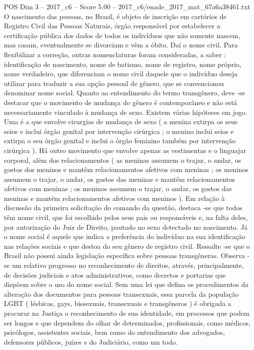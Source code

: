 \begin{textsample}{POS Dim 3 – 2017\_c6 – Score 5.00 – 2017\_c6/enade\_2017\_mat\_67a6a38461.txt}
O nascimento das pessoas, no Brasil, é objeto de inscrição em cartórios de Registro Civil das Pessoas Naturais, órgão responsável por estabelecer a certificação pública dos dados de todos os indivíduos que não somente nascem, mas casam, eventualmente se divorciam e vêm a óbito.
Daí o nome civil.
Para flexibilizar a correção, outras nomenclaturas foram consideradas, a saber : identificação de nascimento, nome de batismo, nome de registro, nome próprio, nome verdadeiro, que diferenciam o nome civil daquele que o indivíduo deseja utilizar para traduzir a sua opção pessoal de gênero, que se convencionou denominar nome social.
Quanto ao entendimento do termo transgênero, deve -se destacar que o movimento de mudança do gênero é contemporâneo e não está necessariamente vinculado à mudança de sexo.
Existem várias hipóteses em jogo.
Uma é a que envolve cirurgias de mudança de sexo ( a menina extirpa os seus seios e inclui órgão genital por intervenção cirúrgica ; o menino inclui seios e extirpa o seu órgão genital e inclui o órgão feminino também por intervenção cirúrgica ).
Há outro movimento que envolve apenas as vestimentas e o linguajar corporal, além dos relacionamentos ( as meninas assumem o trajar, o andar, os gostos dos meninos e mantêm relacionamentos afetivos com meninas ; os meninos assumem o trajar, o andar, os gostos das meninas e mantêm relacionamentos afetivos com meninas ; os meninos assumem o trajar, o andar, os gostos das meninas e mantêm relacionamentos afetivos com meninos ).
Em relação à discussão da primeira solicitação do comando da questão, destaca -se que todos têm nome civil, que foi escolhido pelos seus pais ou responsáveis e, na falta deles, por autorização do Juiz de Direito, pautado no sexo detectado no nascimento.
Já o nome social é aquele que indica a preferência do indivíduo na sua identificação nas relações sociais e que destoa do seu gênero de registro civil.
Ressalte -se que o Brasil não possui ainda legislação específica sobre pessoas transgêneras.
Observa -se um relativo progresso no reconhecimento de direitos, através, principalmente, de decisões judiciais e atos administrativos, como decretos e portarias que dispõem sobre o uso do nome social.
Sem uma lei que defina os procedimentos da alteração dos documentos para pessoas transexuais, essa parcela da população LGBT ( lésbicas, gays, bissexuais, transexuais e transgêneros ) é obrigada a procurar na Justiça o reconhecimento de sua identidade, em processos que podem ser longos e que dependem do olhar de determinados, profissionais, como médicos, psicólogos, assistentes sociais, bem como do entendimento dos advogados, defensores públicos, juízes e do Judiciário, como um todo.

\end{textsample}
